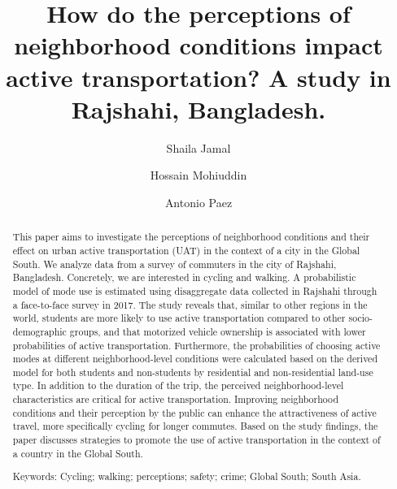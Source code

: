 \documentclass[]{elsarticle} %
\begin{document}
\begin{frontmatter}

  \title{How do the perceptions of neighborhood conditions impact active
transportation? A study in Rajshahi, Bangladesh.}
    \author[McMaster University]{Shaila Jamal}
    \author[University of California]{Hossain Mohiuddin}
    \author[McMaster University]{Antonio Paez}
      \address[McMaster University]{School of Earth, Environment and Society, 1280 Main Street West,
Hamilton, Ontario, Canada, L8S4K1}
    \address[University of California]{Institute of Transportation Studies, University of California, Davis,
1605 Tilia St, Ste 100, Davis, California}
    
  \begin{abstract}
  This paper aims to investigate the perceptions of neighborhood
  conditions and their effect on urban active transportation (UAT) in the
  context of a city in the Global South. We analyze data from a survey of
  commuters in the city of Rajshahi, Bangladesh. Concretely, we are
  interested in cycling and walking. A probabilistic model of mode use is
  estimated using disaggregate data collected in Rajshahi through a
  face-to-face survey in 2017. The study reveals that, similar to other
  regions in the world, students are more likely to use active
  transportation compared to other socio-demographic groups, and that
  motorized vehicle ownership is associated with lower probabilities of
  active transportation. Furthermore, the probabilities of choosing active
  modes at different neighborhood-level conditions were calculated based
  on the derived model for both students and non-students by residential
  and non-residential land-use type. In addition to the duration of the
  trip, the perceived neighborhood-level characteristics are critical for
  active transportation. Improving neighborhood conditions and their
  perception by the public can enhance the attractiveness of active
  travel, more specifically cycling for longer commutes. Based on the
  study findings, the paper discusses strategies to promote the use of
  active transportation in the context of a country in the Global South.
  
  Keywords: Cycling; walking; perceptions; safety; crime; Global South;
  South Asia.
  \end{abstract}
  
 \end{frontmatter}
\end{document}
